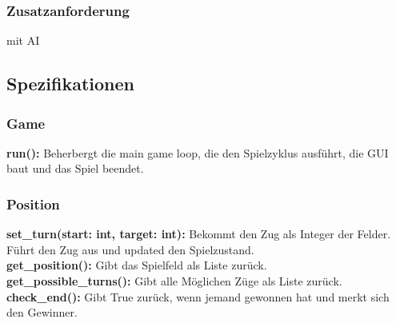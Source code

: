 \documentclass{article}
\begin{document}
\subsubsection{Zusatzanforderung}
mit AI
\begin{figure}[h]
    \centering
\end{figure}

\newpage

\subsection{Spezifikationen}

\subsubsection{Game}

\textbf{run():} Beherbergt die main game loop, die den Spielzyklus ausführt, die GUI baut und das Spiel beendet.

\subsubsection{Position}

\textbf{set\_turn(start: int, target: int):} Bekommt den Zug als Integer der Felder. Führt den Zug aus und updated den Spielzustand. \\
\textbf{get\_position():} Gibt das Spielfeld als Liste zurück. \\
\textbf{get\_possible\_turns():} Gibt alle Möglichen Züge als Liste zurück. \\
\textbf{check\_end():} Gibt True zurück, wenn jemand gewonnen hat und merkt sich den Gewinner. \\
\end{document}
